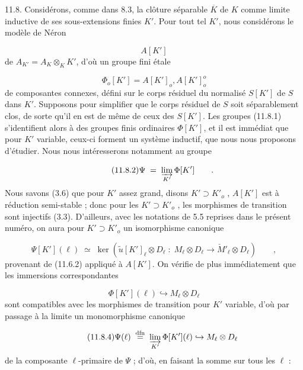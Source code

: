 11.8. Considérons, comme dans 8.3, la clôture séparable $\overline{K}$ de $K$ comme limite inductive de ses sous-extensions finies $K'$. Pour tout tel $K'$, nous considérons le modèle de Néron

\begin{equation*}
A[K']
\end{equation*}
de $A_{K'} = A_K \otimes_K K'$, d'où un groupe fini étale

\begin{equation}\tag{11.8.1}
\Phi_o[K'] = A[K']_o, A[K']_o^o
\end{equation}
de composantes connexes, défini sur le corps résiduel du normalisé $S[K']$ de $S$ dans $K'$. Supposons pour simplifier que le corps résiduel de $S$ soit séparablement clos, de sorte qu'il en est de même de ceux des $S[K']$. Les groupes (11.8.1) s'identifient alors à des groupes finis ordinaires $\Phi[K']$, et il est immédiat que pour $K'$ variable, ceux-ci forment un système inductif, que nous nous proposons d'étudier. Nous nous intéresserons notamment au groupe



\begin{equation}\tag{11.8.2}
\Psi \;=\; \varinjlim_{K'} \Phi[K'] \qquad .
\end{equation}
Nous savons (3.6) que pour $K'$ assez grand, disons $K' \supset K'_o$ , $A[K']$ est à réduction semi-stable ; donc pour les $K' \supset K'_o$ , les morphismes de transition sont injectifs (3.3). D'ailleurs, avec les notations de 5.5 reprises dans le présent numéro, on aura pour $K' \supset K'_o$ un isomorphisme canonique

\begin{equation}\tag{11.8.3}
\Psi[K'](\ell) \;\simeq\; \ker(\widetilde{u}[K']_\ell \otimes D_\ell \;:\; M_\ell \otimes D_\ell \longrightarrow \check{M}'_\ell \otimes D_\ell) \qquad ,
\end{equation}
provenant de (11.6.2) appliqué à $A[K']$. On vérifie de plus immédiatement que les immersions correspondantes

\begin{equation*}
\Phi[K'](\ell) \hookrightarrow M_\ell \otimes D_\ell
\end{equation*}
sont compatibles avec les morphismes de transition pour $K'$ variable, d'où par passage à la limite un monomorphisme canonique

\begin{equation}\tag{11.8.4}
\Psi(\ell) \;\overset{\mathrm{dfn}}{=}\; \varinjlim_{K'} \Phi[K'](\ell) \hookrightarrow M_\ell \otimes D_\ell
\end{equation}
de la composante $\ell$-primaire de $\Psi$ ; d'où, en faisant la somme sur tous les $\ell$ :

